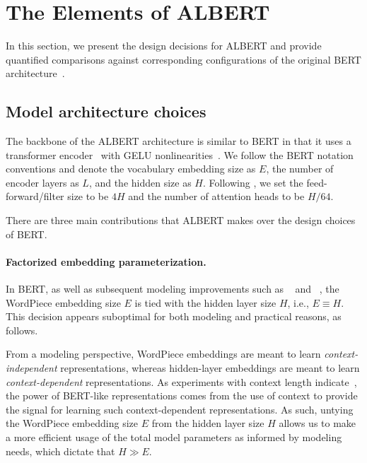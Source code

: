 \section{The Elements of ALBERT}
\label{sec:model}
In this section, we present the design decisions for ALBERT and provide quantified comparisons against corresponding configurations of the original BERT architecture~\citep{devlin2018bert}.


\subsection{Model architecture choices}
The backbone of the ALBERT architecture is similar to BERT in that it uses a transformer encoder~\citep{vaswani2017attention} with GELU nonlinearities~\citep{hendrycks2016gelus}. 
We follow the BERT notation conventions and denote the vocabulary embedding size as $E$, the number of encoder layers as $L$, and the hidden size as $H$. Following \cite{devlin2018bert}, 
we set the feed-forward/filter size to be $4H$ and the number of attention heads to be $H/64$. 

There are three main contributions that ALBERT makes over the design choices of BERT.

\paragraph{Factorized embedding parameterization.}
In BERT, as well as subsequent modeling improvements such as \xlnet~\citep{yang2019xlnet} and \roberta~\citep{liu2019roberta}, the WordPiece embedding size $E$ is tied with the hidden layer size $H$, i.e., $E\equiv H$.
This decision appears suboptimal for both modeling and practical reasons, as follows.

From a modeling perspective, WordPiece embeddings are meant to learn {\em context-independent} representations, whereas hidden-layer embeddings are meant to learn {\em context-dependent} representations.
As experiments with context length indicate~\citep{liu2019roberta}, the power of BERT-like representations comes from the use of context to provide the signal for learning such context-dependent representations.
As such, untying the WordPiece embedding size $E$ from the hidden layer size $H$ allows us to make a more efficient usage of the total model parameters as informed by modeling needs, which dictate that $H \gg E$. 

